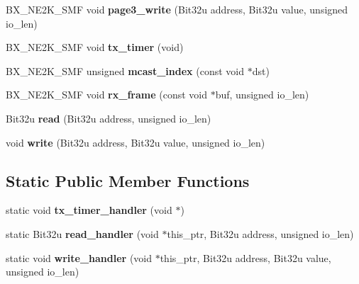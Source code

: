 \begin{DoxyCompactItemize}
\item 
\hypertarget{classbx__ne2k__c_a0b3925c293544d2288ccf6e1c81f5d87}{B\-X\-\_\-\-N\-E2\-K\-\_\-\-S\-M\-F void {\bfseries page3\-\_\-write} (Bit32u address, Bit32u value, unsigned io\-\_\-len)}\label{classbx__ne2k__c_a0b3925c293544d2288ccf6e1c81f5d87}

\item 
\hypertarget{classbx__ne2k__c_a95fc7395914b4793e1e74b830662a6b7}{B\-X\-\_\-\-N\-E2\-K\-\_\-\-S\-M\-F void {\bfseries tx\-\_\-timer} (void)}\label{classbx__ne2k__c_a95fc7395914b4793e1e74b830662a6b7}

\item 
\hypertarget{classbx__ne2k__c_a5f688a5d84b134997d011dcc8db8504e}{B\-X\-\_\-\-N\-E2\-K\-\_\-\-S\-M\-F unsigned {\bfseries mcast\-\_\-index} (const void $\ast$dst)}\label{classbx__ne2k__c_a5f688a5d84b134997d011dcc8db8504e}

\item 
\hypertarget{classbx__ne2k__c_aa5d314861515c0d6353aa9f4b56405ea}{B\-X\-\_\-\-N\-E2\-K\-\_\-\-S\-M\-F void {\bfseries rx\-\_\-frame} (const void $\ast$buf, unsigned io\-\_\-len)}\label{classbx__ne2k__c_aa5d314861515c0d6353aa9f4b56405ea}

\item 
\hypertarget{classbx__ne2k__c_a57e42d07a6bb408f428a3eace15921ff}{Bit32u {\bfseries read} (Bit32u address, unsigned io\-\_\-len)}\label{classbx__ne2k__c_a57e42d07a6bb408f428a3eace15921ff}

\item 
\hypertarget{classbx__ne2k__c_aa2a39611a06e9111e5218aa3e7dc0dd3}{void {\bfseries write} (Bit32u address, Bit32u value, unsigned io\-\_\-len)}\label{classbx__ne2k__c_aa2a39611a06e9111e5218aa3e7dc0dd3}

\end{DoxyCompactItemize}
\subsection*{Static Public Member Functions}
\begin{DoxyCompactItemize}
\item 
\hypertarget{classbx__ne2k__c_a096b6d391193d92950820c928bfc9d2b}{static void {\bfseries tx\-\_\-timer\-\_\-handler} (void $\ast$)}\label{classbx__ne2k__c_a096b6d391193d92950820c928bfc9d2b}

\item 
\hypertarget{classbx__ne2k__c_a3576daab1d71db4fc5f067d4a81dff6f}{static Bit32u {\bfseries read\-\_\-handler} (void $\ast$this\-\_\-ptr, Bit32u address, unsigned io\-\_\-len)}\label{classbx__ne2k__c_a3576daab1d71db4fc5f067d4a81dff6f}

\item 
\hypertarget{classbx__ne2k__c_a9f56ef73311b2366b135c3edacf048fc}{static void {\bfseries write\-\_\-handler} (void $\ast$this\-\_\-ptr, Bit32u address, Bit32u value, unsigned io\-\_\-len)}\label{classbx__ne2k__c_a9f56ef73311b2366b135c3edacf048fc}

\end{DoxyCompactItemize}
